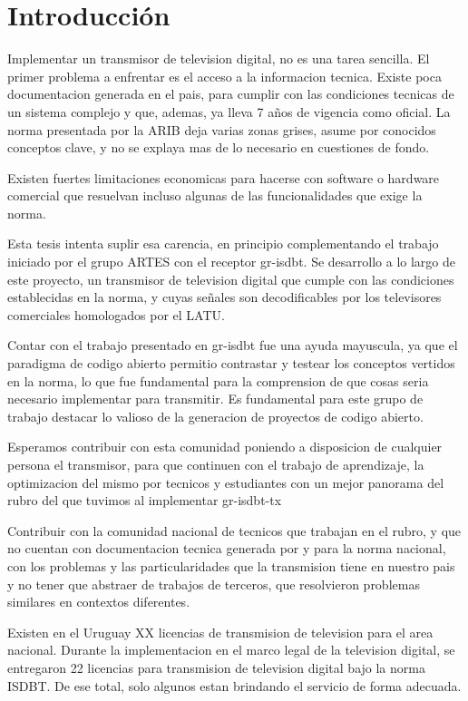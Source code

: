 \chapter{Introducción}

Implementar un transmisor de television digital, no es una tarea sencilla. El primer problema a enfrentar es el acceso a la informacion tecnica. Existe poca documentacion generada en el pais, para cumplir con las condiciones tecnicas de un sistema complejo y que, ademas, ya lleva 7 años de vigencia como oficial. La norma presentada por la ARIB deja varias zonas grises, asume por conocidos conceptos clave, y no se explaya mas de lo necesario en cuestiones de fondo. 

Existen fuertes limitaciones economicas para hacerse con software o hardware comercial que resuelvan incluso algunas de las funcionalidades que exige la norma. 

Esta tesis intenta suplir esa carencia, en principio complementando el trabajo iniciado por el grupo ARTES con el receptor gr-isdbt. Se desarrollo a lo largo de este proyecto, un transmisor de television digital que cumple con las condiciones establecidas en la norma, y cuyas señales son decodificables por los televisores comerciales homologados por el LATU.

Contar con el trabajo presentado en gr-isdbt fue una ayuda mayuscula, ya que el paradigma de codigo abierto permitio contrastar y testear los conceptos vertidos en la norma, lo que fue fundamental para la comprension de que cosas seria necesario implementar para transmitir. Es fundamental para este grupo de trabajo destacar lo valioso de la generacion de proyectos de codigo abierto.

Esperamos contribuir con esta comunidad poniendo a disposicion de cualquier persona el transmisor, para que continuen con el trabajo de aprendizaje, la optimizacion del mismo por tecnicos y estudiantes con un mejor panorama del rubro del que tuvimos al implementar gr-isdbt-tx

Contribuir con la comunidad nacional de tecnicos que trabajan en el rubro, y que no cuentan con documentacion tecnica generada por y para la norma nacional, con los problemas y las particularidades que la transmision tiene en nuestro pais y no tener que abstraer de trabajos de terceros, que resolvieron problemas similares en contextos diferentes.

Existen en el Uruguay XX licencias de transmision de television para el area nacional. Durante la implementacion en el marco legal de la television digital, se entregaron 22 licencias para transmision de television digital bajo la norma ISDBT. De ese total, solo algunos estan brindando el servicio de forma adecuada.

